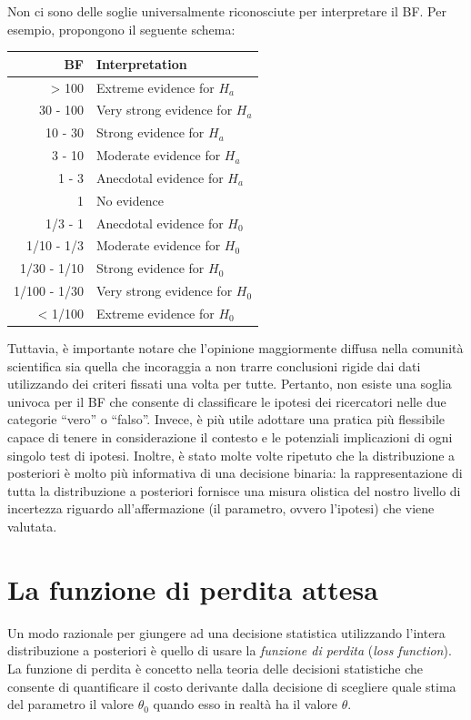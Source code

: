 \documentclass[
  11pt,
]{krantz}
\theoremstyle{definition}
\theoremstyle{definition}
\theoremstyle{definition}
\theoremstyle{definition}
\theoremstyle{remark}
\begin{document}
Non ci sono delle soglie universalmente riconosciute per interpretare il BF. Per esempio, \citet{lee2014bayesian} propongono il seguente schema:

\begin{longtable}[]{@{}rl@{}}
\toprule
BF & Interpretation \\
\midrule
\endhead
\textgreater{} 100 & Extreme evidence for \(H_a\) \\
30 - 100 & Very strong evidence for \(H_a\) \\
10 - 30 & Strong evidence for \(H_a\) \\
3 - 10 & Moderate evidence for \(H_a\) \\
1 - 3 & Anecdotal evidence for \(H_a\) \\
1 & No evidence \\
1/3 - 1 & Anecdotal evidence for \(H_0\) \\
1/10 - 1/3 & Moderate evidence for \(H_0\) \\
1/30 - 1/10 & Strong evidence for \(H_0\) \\
1/100 - 1/30 & Very strong evidence for \(H_0\) \\
\textless{} 1/100 & Extreme evidence for \(H_0\) \\
\bottomrule
\end{longtable}

Tuttavia, è importante notare che l'opinione maggiormente diffusa nella comunità scientifica sia quella che incoraggia a non trarre conclusioni rigide dai dati utilizzando dei criteri fissati una volta per tutte. Pertanto, non esiste una soglia univoca per il BF che consente di classificare le ipotesi dei ricercatori nelle due categorie ``vero'' o ``falso''. Invece, è più utile adottare una pratica più flessibile capace di tenere in considerazione il contesto e le potenziali implicazioni di ogni singolo test di ipotesi. Inoltre, è stato molte volte ripetuto che la distribuzione a posteriori è molto più informativa di una decisione binaria: la rappresentazione di tutta la distribuzione a posteriori fornisce una misura olistica del nostro livello di incertezza riguardo all'affermazione (il parametro, ovvero l'ipotesi) che viene valutata.

\hypertarget{la-funzione-di-perdita-attesa}{%
\section{La funzione di perdita attesa}\label{la-funzione-di-perdita-attesa}}

Un modo razionale per giungere ad una decisione statistica utilizzando l'intera distribuzione a posteriori è quello di usare la \emph{funzione di perdita} (\emph{loss function}). La funzione di perdita è concetto nella teoria delle decisioni statistiche che consente di quantificare il costo derivante dalla decisione di scegliere quale stima del parametro il valore \(\theta_0\) quando esso in realtà ha il valore \(\theta\).
\end{document}
